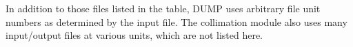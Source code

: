 \begin{center}
\begin{longtable}{|c|c|c|c|>{\raggedright\arraybackslash}p{7.8cm}|}
    \hline
\end{longtable}
\end{center}

In addition to those files listed in the table, DUMP uses arbitrary file unit numbers as determined by the input file.
The collimation module also uses many input/output files at various units, which are not listed here.
